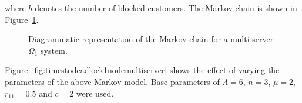 \documentclass{article}
\numberwithin{equation}{section}
\begin{document}
where $b$ denotes the number of blocked customers.
The Markov chain is shown in Figure~\ref{fig:1nodeMCms}.

\begin{figure}[!htbp]
    \begin{center}
    
    \end{center}
    \caption{Diagrammatic representation of the Markov chain for a
    multi-server $\Omega_1$ system.}
    \label{fig:1nodeMCms}
\end{figure}

Figure~\ref{fig:timestodeadlock1nodemultiserver} shows the effect of varying
the parameters of the above Markov model.
Base parameters of $\Lambda = 6$, $n = 3$, $\mu = 2$, $r_{11} = 0.5$ and
$c = 2$ were used.
\end{document}
